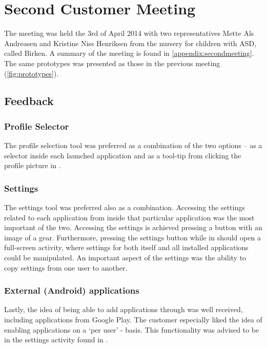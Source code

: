 \section{Second Customer Meeting}\label{sec:sprint2:secondmeeting}
The meeting was held the 3rd of April 2014 with two representatives Mette Als Andreasen and Kristine Niss Henriksen from the nursery for children with ASD, called Birken.
A summary of the meeting is found in \cref{appendix:secondmeeting}.
The same prototypes was presented as those in the previous meeting (\cref{fig:prototypes}).

\subsection{Feedback}

\subsubsection*{Profile Selector}
The profile selection tool was preferred as a combination of the two options -- as a selector inside each launched application and as a tool-tip from clicking the profile picture in \launcher.

\subsubsection{Settings}
The settings tool was preferred also as a combination.
Accessing the settings related to each application from inside that particular application was the most important of the two. Accessing the settings is achieved pressing a button with an image of a gear.
Furthermore, pressing the settings button while in \launcher should open a full-screen activity, where settings for both \launcher itself and all installed applications could be manipulated.
An important aspect of the settings was the ability to copy settings from one user to another.

\subsubsection{External (Android) applications}
Lastly, the idea of being able to add applications through \launcher was well received, including applications from Google Play.
The customer especially liked the idea of enabling applications on a `per user' - basis.
This functionality was advised to be in the settings activity found in \launcher.


